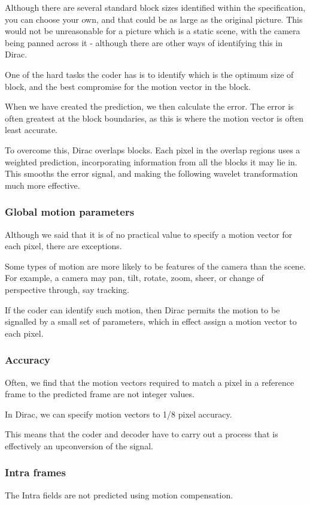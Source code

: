 Although there are several standard block sizes identified within the
specification, you can choose your own, and that could be as large as
the original picture. This would not be unreasonable for a picture which
is a static scene, with the camera being panned across it - although
there are other ways of identifying this in Dirac.

One of the hard tasks the coder has is to identify which is the optimum
size of block, and the best compromise for the motion vector in the
block.

When we have created the prediction, we then calculate the error. The
error is often greatest at the block boundaries, as this is where the
motion vector is often least accurate.

To overcome this, Dirac overlaps blocks. Each pixel in the overlap
regions uses a weighted prediction, incorporating information from all
the blocks it may lie in. This smooths the error signal, and making the
following wavelet transformation much more effective.

\subsubsection{Global motion parameters}

Although we said that it is of no practical value to specify a motion
vector for each pixel, there are exceptions.

Some types of motion are more likely to be features of the camera than
the scene. For example, a camera may pan, tilt, rotate, zoom, sheer, or
change of perspective through, say tracking.

If the coder can identify such motion, then Dirac permits the motion to
be signalled by a small set of parameters, which in effect assign a
motion vector to each pixel.

\subsubsection{Accuracy}
Often, we find that the motion vectors required to match a pixel in a
reference frame to the predicted frame are not integer values.

In Dirac, we can specify motion vectors to 1/8 pixel accuracy.

This means that the coder and decoder have to carry out a process that
is effectively an upconversion of the signal.

\subsubsection{Intra frames}
The Intra fields are not predicted using motion compensation.


